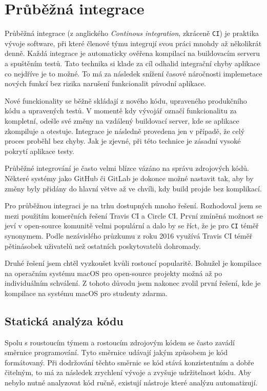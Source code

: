 \section{Průběžná integrace}

Průběžná integrace (z anglického \textit{Continous integration}, zkráceně \texttt{CI}) je praktika vývoje software, při které členové týmu integrují svou práci mnohdy až několikrát denně.
Každá integrace je automaticky ověřena kompilací na buildovacím serveru a spuštěním testů.
Tato technika si klade za cíl odhalid integrační chyby aplikace co nejdříve je to možné. \cite{gitlab-use-ci}
To má za následek snížení časové náročnosti implemetace nových funkcí bez rizika narušení funkcionalit původní aplikace.

Nové funckionality se běžně skládají z nového kódu, upraveného produkčního kódu a upravených testů.
V momentě kdy vývojář označí funkcionalitu za kompletní, odešle své změny na vzdálený buildovací server, kde se aplikace zkompiluje a otestuje.
Integrace je následně provedena jen v případě, že celý proces proběhl bez chyby.
Jak je zjevné, při této technice je zásadní vysoké pokrytí aplikace testy.

Průběžné integrování je často velmi blízce vázáno na správu zdrojových kódů.
Některé systémy jako GitHub či GitLab je dokonce možné nastavit tak, aby by změny byly přidány do hlavní větve až ve chvíli, kdy build projde bez komplikací. \cite{travis-ci-building-pr}

Pro průběžnou integraci je na trhu dostupných mnoho řešení.
Rozhodoval jsem se mezi použitím komerčních řešení Travis CI a Circle CI.
První zmíněná možnost se jeví v open-source komunitě velmi populární a dalo by se říct, že je pro \texttt{CI} téměř synonymem.
Podle nezávislého průzkumu z roku 2016 využívá Travis CI téměř pětinásobek uživatelů než ostatních poskytovatelů dohromady. \cite{oregonstate-ci-survey}

Druhé řešení jsem chtěl vyzkoušet kvůli rostoucí popularitě. \cite{circleci-popularity}
Bohužel je kompilace na operačním systému macOS pro open-source projekty možná až po individuálním schválení. \cite{circleci-pricing}
Z tohoto důvodu jsem nakonec zvolil první řešení, kde je kompilace na systému macOS pro studenty zdarma.

\subsection{Statická analýza kódu}

Spolu s roustoucím týmem a rostoucím zdrojovým kódem se často zavádí směrnice programování.
Tyto směrnice udávají jakým způsobem je kód formátovaný.
Při dodržování těchto směrnic se kód stává konzistentním a dobře čitelným, to má za následek zrychlení vývoje a zvyšuje udržitelnost kódu.
Aby nebylo nutné analyzovat kód ručně, existují nástroje které analýzu automatizují.

